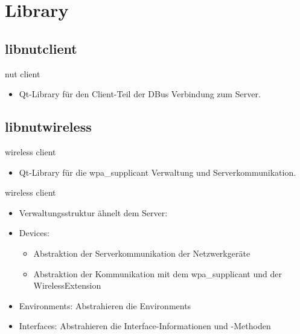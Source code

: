 
\section{Library}
\subsection{libnutclient}
\begin{frame}[<+-| alert@+>]{nut client}
	\begin{itemize}
		\item Qt-Library für den Client-Teil der DBus Verbindung zum Server.
	\end{itemize}
\end{frame}

\subsection{libnutwireless}
\begin{frame}[<+-| alert@+>]{wireless client}
	\begin{itemize}
		\item Qt-Library für die wpa\_supplicant Verwaltung und Serverkommunikation.
	\end{itemize}
\end{frame}

\begin{frame}[<+-| alert@+>]{wireless client}
	\begin{itemize}
		\item Verwaltungsstruktur ähnelt dem Server:
		\item Devices:
		\begin{itemize}
			\item Abstraktion der Serverkommunikation der Netzwerkgeräte
			\item Abstraktion der Kommunikation mit dem wpa\_supplicant und der WirelessExtension 
		\end{itemize}

		\item Environments: Abstrahieren die Environments
		\item Interfaces: Abstrahieren die Interface-Informationen und -Methoden
	\end{itemize}
\end{frame}